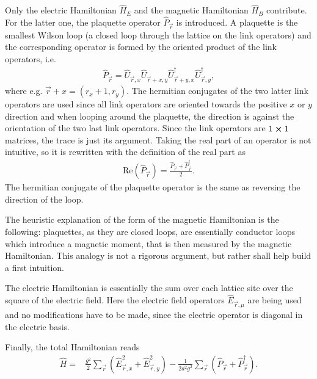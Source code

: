 Only the electric Hamiltonian $\hat{H}_E$ and the magnetic Hamiltonian $\hat{H}_B$ contribute. For the latter one, the plaquette operator $\hat{P}_{\vec{r}}$ is introduced. A plaquette is the smallest Wilson loop (a closed loop through the lattice on the link operators) and the corresponding operator is formed by the oriented product of the link operators, i.e.
\begin{align}
	\hat{P}_{\vec{r}}=\hat{U}_{\vec{r}, x}\hat{U}_{\vec{r}+x,y}\hat{U}^{\dag}_{\vec{r}+y,x}\hat{U}^{\dag}_{\vec{r},y},
\end{align}
where e.g. $\vec{r}+x=(r_x+1,r_y)$. The hermitian conjugates of the two latter link operators are used since all link operators are oriented towards the positive $x$ or $y$ direction and when looping around the plaquette, the direction is against the orientation of the two last link operators. Since the link operators are $1\cross1$ matrices, the trace is just its argument. Taking the real part of an operator is not intuitive, so it is rewritten with the definition of the real part as 
\begin{align}
  \text{Re}(\hat{P}_{\vec{r}})=\frac{\hat{P}_{\vec{r}}+\hat{P}_{\vec{r}}^{\dag}}{2}.
\end{align}
The hermitian conjugate of the plaquette operator is the same as reversing the direction of the loop.

The heuristic explanation of the form of the magnetic Hamiltonian is the following: plaquettes, as they are closed loops, are essentially conductor loops which introduce a magnetic moment, that is then measured by the magnetic Hamiltonian. This analogy is not a rigorous argument, but rather shall help build a first intuition.

The electric Hamiltonian is essentially the sum over each lattice site over the square of the electric field. Here the electric field operators $\hat{E}_{\vec{r},\mu}$ are being used and no modifications have to be made, since the electric operator is diagonal in the electric basis.

Finally, the total Hamiltonian reads
\begin{align*}
  \hat{H} = & \frac{g^2}{2}\sum_{\vec{r}}\left(\hat{E}_{\vec{r}, x}^2+\hat{E}_{\vec{r}, y}^2\right)-\frac{1}{2a^2g^2}\sum_{\vec{r}}\left(\hat{P}_{\vec{r}}+\hat{P}_{\vec{r}}^{\dag}\right).
\end{align*}
  
